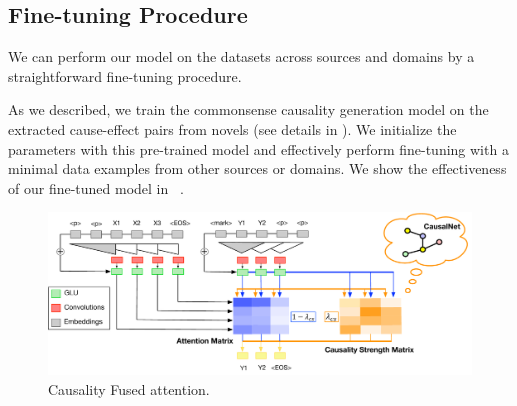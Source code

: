 \subsection{Fine-tuning Procedure}
We can perform our model on the datasets across sources and domains by a straightforward fine-tuning procedure.

As we described, we train the commonsense causality
generation model on the extracted cause-effect pairs
from novels (see details in ). 
We initialize the parameters with this pre-trained model and effectively perform fine-tuning with a minimal data examples from other sources or domains. 
We show the effectiveness of our fine-tuned model in
~.




\begin{figure}[th]
    \centering
    \includegraphics[width=2\columnwidth]{fusedatt2}
    \caption{Causality Fused attention. }
    \label{fig:fusedatt}
\end{figure}


